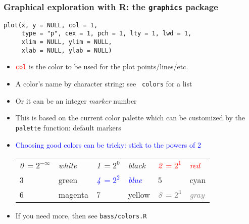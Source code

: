 \documentclass[11pt,pdftex,dvipsnames,usenames,helvetica]{beamer}
\newcommand*{\blue}[1]{\textcolor{blue}{#1}}
\begin{document}
\begin{frame}[fragile]
\frametitle{Graphical exploration with R: the {\tt graphics} package}
\begin{verbatim}
plot(x, y = NULL, col = 1, 
     type = "p", cex = 1, pch = 1, lty = 1, lwd = 1,
     xlim = NULL, ylim = NULL,
     xlab = NULL, ylab = NULL)
\end{verbatim}
\begin{itemize}
\item \textcolor{red}{\tt col} is the color to be used for the plot
  points/lines/etc.
\item A color's name by character string: see {\tt
    colors} for a list
\item Or it can be an integer {\it marker} number
\item This is based on the current color palette which
can be customized by the {\tt palette} function: default markers
\item \blue{Choosing good colors can be tricky: stick to the powers of 2}
\begin{tabular}{ll|ll|ll}
{\it 0}$\,=2^{-\infty}$ & {\it white} &
{\it 1}$\,=2^0$ & {\it black} &
\textcolor{red}{\it 2$\,=2^1$} & \textcolor{red}{\it red} \\
3 & green & 
\textcolor{blue}{\it 4$\,=2^2$} & \textcolor{blue}{\it blue} &
5 & cyan \\
6 & magenta & 7 & yellow &
\textcolor{gray}{\it 8$\,=2^3$} & \textcolor{gray}{\it gray} \\
\end{tabular}
\begin{comment}
\begin{tabular}{ll|ll|ll|ll}
{\it 1}$\,=2^0$ & {\it black} &
\textcolor{red}{\it 2$\,=2^1$} & \textcolor{red}{\it red} \\
3 & green &
\textcolor{blue}{\it 4$\,=2^2$} & \textcolor{blue}{\it blue} &
5 & cyan & 6 & magenta \\
7 & yellow &
\textcolor{gray}{\it 8$\,=2^3$} & \textcolor{gray}{\it gray} \\
\end{tabular}
\end{comment}
\item If you need more, then see {\tt bass/colors.R}
\end{itemize}
\end{frame}
\end{document}
